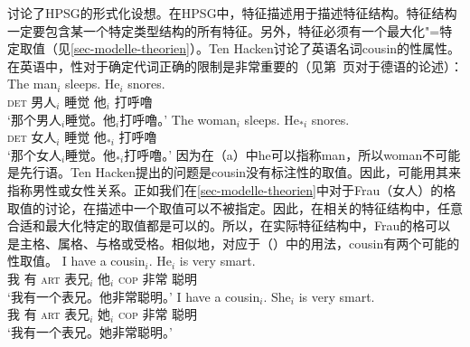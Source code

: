 \mbox{}讨论了HPSG\indexhpsgc 的形式化设想。在HPSG中，特征描述用于描述特征结构。特征结构一定要包含某一个特定类型结构的所有特征。另外，特征必须有一个最大化"=特定取值（见\ref{sec-modelle-theorien}）。Ten Hacken讨论了英语名词cousin的性属性。在英语中，性对于确定代词正确的限制是非常重要的（见第~\pageref{le-buch}页对于德语的论述）：
\eal
\ex 
\gll The man$_i$ sleeps. He$_i$ snores.\\
	 \textsc{det} 男人$_i$ 睡觉 他$_i$  打呼噜\\
\glt `那个男人$_i$睡觉。他$_i$打呼噜。'
\ex 
\gll The woman$_i$ sleeps. He$_{*i}$ snores.\\
	 \textsc{det} 女人$_i$ 睡觉 他$_{*i}$  打呼噜\\
\glt `那个女人$_i$睡觉。他$_{*i}$打呼噜。'
\zl
因为在（a）中he可以指称man，所以woman不可能是先行语。Ten Hacken提出的问题是cousin没有标注性的取值。因此，可能用其来指称男性或女性关系。正如我们在\ref{sec-modelle-theorien}中对于Frau（女人）的格取值的讨论，在描述中一个取值可以不被指定。因此，在相关的特征结构中，任意合适和最大化特定的取值都是可以的。所以，在实际特征结构中，Frau的格可以是主格、属格、与格或受格。相似地，对应于（）中的用法，cousin有两个可能的性取值。
\eal
\ex 
\gll I have a cousin$_i$. He$_i$ is very smart.\\
	 我 有 \textsc{art} 表兄$_i$ 他$_i$ \textsc{cop} 非常 聪明\\
\glt `我有一个表兄。他非常聪明。'
\ex 
\gll I have a cousin$_i$. She$_i$ is very smart.\\
	 我 有 \textsc{art} 表兄$_i$ 她$_i$ \textsc{cop} 非常 聪明\\
\glt `我有一个表兄。她非常聪明。'
\zl

